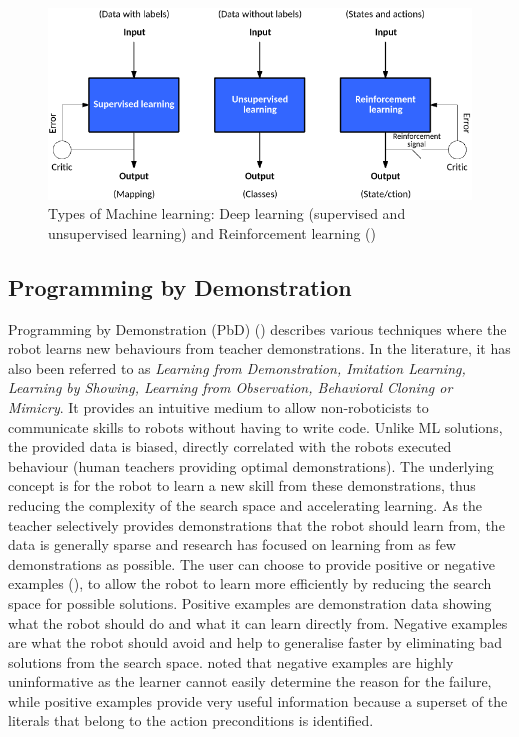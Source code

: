 
\begin{figure}[ht]
	\centering
	\includegraphics[width=\linewidth]{figures/ml-techniques}
	\caption{Types of Machine learning: Deep learning (supervised and unsupervised learning) and Reinforcement learning (\cite{jones2017models})}
	\label{fig:ml-types}
\end{figure}

\subsection{Programming by Demonstration}\label{sssec:PbD}
Programming by Demonstration (PbD) (\cite{billard2016learning,argall2009survey}) describes various techniques where the robot learns new behaviours from teacher demonstrations.
In the literature, it has also been referred to as \textit{Learning from Demonstration, Imitation Learning, Learning by Showing, Learning from Observation, Behavioral Cloning or Mimicry}.
It provides an intuitive medium to allow non-roboticists to communicate skills to robots without having to write code.
Unlike ML solutions, the provided data is biased, \ie directly correlated with the robots executed behaviour (\eg human teachers providing optimal demonstrations).
The underlying concept is for the robot to learn a new skill from these demonstrations, thus reducing the complexity of the search space and accelerating learning.
As the teacher selectively provides demonstrations that the robot should learn from, the data is generally sparse and research has focused on learning from as few demonstrations as possible.
The user can choose to provide positive or negative examples (\cite{grollman2012robot}), to allow the robot to learn more efficiently by reducing the search space for possible solutions.
Positive examples are demonstration data showing what the robot should do and what it can learn directly from. %
Negative examples are what the robot should avoid and help to generalise faster by eliminating bad solutions from the search space. %
\cite{walsh2010efficient} noted that negative examples are highly uninformative as the learner cannot easily determine the reason for the failure, while positive examples provide very useful information because a superset of the literals that belong to the action preconditions is identified.

